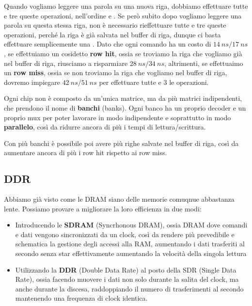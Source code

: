 \documentclass[11pt, a4paper, titlepage, oneside]{scrbook}
\begin{document}
Quando vogliamo leggere una parola su una nuova riga, dobbiamo effettuare tutte e tre queste operazioni, nell'ordine  e . Se però subito dopo vogliamo leggere una parola su questa stessa riga, non è necessario rieffettuare tutte e tre queste operazioni, perché la riga è già salvata nel buffer di riga, dunque ci basta effettuare semplicemente una . Dato che ogni comando ha un costo di $\SI{14}{ns}/\SI{17}{ns}$, se effettuiamo un cosidetto \textbf{row hit}, ossia se troviamo la riga che vogliamo già nel buffer di riga, riusciamo a risparmiare $\SI{28}{ns}/\SI{34}{ns}$, altrimenti, se effettuaimo un \textbf{row miss}, ossia se non troviamo la riga che vogliamo nel buffer di riga, dovremo impiegare $\SI{42}{ns}/\SI{51}{ns}$ per effettuare tutte e 3 le operazioni.

\begin{Definizione}[Banchi]
\label{def-banchi}
Ogni chip non è composto da un'unica matrice, ma da più matrici indipendenti, che prendono il nome di \textbf{banchi} (banks). Ogni banco ha un proprio decoder e un proprio mux per poter lavorare in modo indipendente e soprattutto in modo \textbf{parallelo}, così da ridurre ancora di più i tempi di lettura/scrittura.
\end{Definizione}

Con più banchi è possibile poi avere più righe salvate nel buffer di riga, così da aumentare ancora di più i row hit rispetto ai row miss.

\subsection{DDR}

Abbiamo già visto come le DRAM siano delle memorie comuqnue abbastanza lente. Possiamo provare a migliorare la loro efficienza in due modi:
\begin{itemize}
    \item Introducendo le \textbf{SDRAM} (Syncrhonous DRAM), ossia DRAM dove comandi e dati vengono sincronizzati da un clock, così da rendere più prevedibile e schematica la gestione degli accessi alla RAM, aumentando i dati trasferiti al secondo senza star effettivamente aumentando la velocità della singola lettura
    \item Utilizzando la \textbf{DDR} (Double Data Rate) al posto della SDR (Single Data Rate), ossia facendo muovere i dati non solo durante la salita del clock, ma anche durante la discesa, raddoppiando il numero di trasferimenti al secondo mantenendo una frequenza di clock identica. 
\end{itemize}
\end{document}
